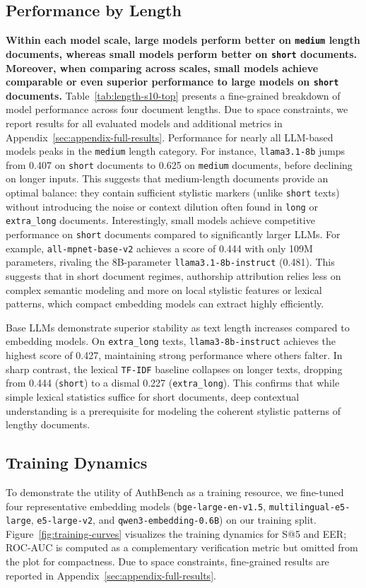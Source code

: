 \documentclass{article}
\newcommand{\rev}[1]{#1}
\begin{document}
\subsection{Performance by Length}
\textbf{Within each model scale, large models perform better on \texttt{medium} length documents, whereas small models perform better on \texttt{short} documents. Moreover, when comparing across scales, small models achieve comparable or even superior performance to large models on \texttt{short} documents.} Table~\ref{tab:length-s10-top} presents a fine-grained breakdown of model performance across four document lengths. Due to space constraints, we report results for all evaluated models and additional metrics in Appendix~\ref{sec:appendix-full-results}.
Performance for nearly all LLM-based models peaks in the \texttt{medium} length category. 
For instance, \texttt{llama3.1-8b} jumps from 0.407 on \texttt{short} documents to 0.625 on \texttt{medium} documents, before declining on longer inputs. This suggests that medium-length documents provide an optimal balance: they contain sufficient stylistic markers (unlike \texttt{short} texts) without introducing the noise or context dilution often found in \texttt{long} or \texttt{extra\_long} documents. Interestingly, small models achieve competitive performance on \texttt{short} documents compared to significantly larger LLMs. For example, \texttt{all-mpnet-base-v2} achieves a score of 0.444 with only 109M parameters, rivaling the 8B-parameter \texttt{llama3.1-8b-instruct} (0.481). This suggests that in short document regimes, authorship attribution relies less on complex semantic modeling and more on local stylistic features or lexical patterns, which compact embedding models can extract highly efficiently.


Base LLMs demonstrate superior stability as text length increases compared to embedding models. On \texttt{extra\_long} texts, \texttt{llama3-8b-instruct} achieves the highest score of 0.427, maintaining strong performance where others falter. In sharp contrast, the lexical \texttt{TF-IDF} baseline collapses on longer texts, dropping from 0.444 (\texttt{short}) to a dismal 0.227 (\texttt{extra\_long}). This confirms that while simple lexical statistics suffice for short documents, deep contextual understanding is a prerequisite for modeling the coherent stylistic patterns of lengthy documents. 


\subsection{Training Dynamics}
\label{sec:dynamics}
To demonstrate the utility of AuthBench as a training resource, we fine-tuned four representative embedding models (\texttt{bge-large-en-v1.5}, \texttt{multilingual-e5-large}, \texttt{e5-large-v2}, and \texttt{qwen3-embedding-0.6B}) on our training split. Figure~\ref{fig:training-curves} visualizes the training dynamics for S@5 and EER; \rev{ROC-AUC is computed as a complementary verification metric but omitted from the plot for compactness.} Due to space constraints, fine-grained results are reported in Appendix~\ref{sec:appendix-full-results}.
\end{document}
